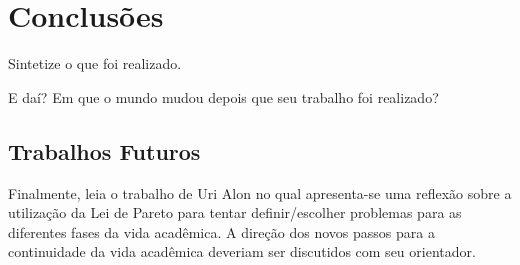 \chapter{Conclusões}
\label{chp:conclusoes}

Sintetize o que foi realizado. \lipsum[2]

E daí? Em que o mundo mudou depois que seu trabalho foi realizado?

\section{Trabalhos Futuros} 

Finalmente, leia o trabalho de Uri Alon \citep{Alon2009} no qual apresenta-se
uma reflexão sobre a utilização da Lei de Pareto para tentar definir/escolher
problemas para as diferentes fases da vida acadêmica.  A direção dos novos
passos para a continuidade da vida acadêmica deveriam ser discutidos com seu
orientador.





